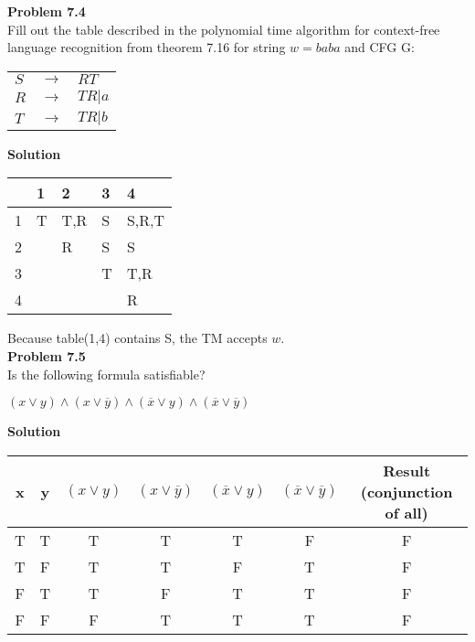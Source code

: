 \documentclass{article}
\newcommand{\problem}[1]{\large{\textbf{Problem #1}}\\}
\begin{document}
\pagebreak

\problem{7.4}
Fill out the table described in the polynomial time algorithm for context-free language
recognition from theorem 7.16 for string $w = baba$ and CFG G:\\
    \begin{table}[h!]
    \centering
    \begin{tabular}{lll}
     $S$     & $\rightarrow$ &  $RT    $ \\
     $R$     & $\rightarrow$ &  $TR | a$ \\
     $T$     & $\rightarrow$ &  $TR | b$
    \end{tabular}
    \end{table}

\textbf{Solution}\\

    \begin{table}[h!]
    \centering
    \begin{tabular}{|l|l|l|l|l|} \hline
         & 1 & 2   & 3 & 4 \\ \hline
       1 & T & T,R & S & S,R,T \\ \hline
       2 &   & R   & S & S \\ \hline
       3 &   &     & T & T,R \\ \hline
       4 &   &     &   & R \\ \hline
    \end{tabular}
    \end{table}

    Because table(1,4) contains S, the TM accepts $w$. \\

\vspace{2cm}
\problem{7.5}
    Is the following formula satisfiable? \\ 

    \begin{centering}
    $(x \vee y) \wedge (x \vee \overline{y}) \wedge (\overline{x} \vee y) \wedge (\overline{x} \vee \overline{y})$ \\
    \end{centering}


\textbf{Solution}\\

    \begin{table}[h!]
    \centering
    \begin{tabular}{cc|c|c|c|c|c}
    x & y & $(x \vee y)$ & $(x \vee \overline{y})$  & $(\overline{x} \vee y)$ & $(\overline{x} \vee \overline{y})$ & Result (conjunction of all) \\ \hline
    T & T &     T        &    T                     &    T                    &  F      &  F\\
    T & F &     T        &    T                     &    F                    &  T      &  F\\
    F & T &     T        &    F                     &    T                    &  T      &  F\\
    F & F &     F        &    T                     &    T                    &  T      &  F\\
    \end{tabular}
    \end{table}
\end{document}

